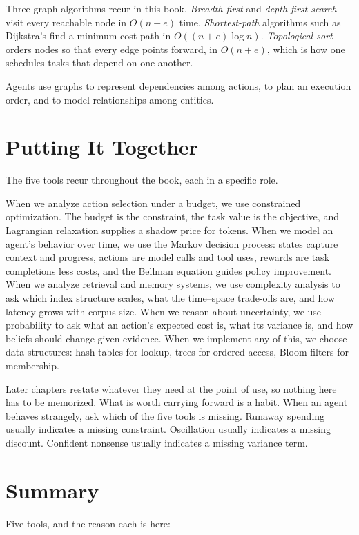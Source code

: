 \documentclass[11pt]{book}
\begin{document}
Three graph algorithms recur in this book. \emph{Breadth-first} and \emph{depth-first search} visit every reachable node in $O(n + e)$ time. \emph{Shortest-path} algorithms such as Dijkstra's find a minimum-cost path in $O((n + e) \log n)$. \emph{Topological sort} orders nodes so that every edge points forward, in $O(n + e)$, which is how one schedules tasks that depend on one another.

Agents use graphs to represent dependencies among actions, to plan an execution order, and to model relationships among entities.

\section{Putting It Together}

The five tools recur throughout the book, each in a specific role.

When we analyze action selection under a budget, we use constrained optimization. The budget is the constraint, the task value is the objective, and Lagrangian relaxation supplies a shadow price for tokens. When we model an agent's behavior over time, we use the Markov decision process: states capture context and progress, actions are model calls and tool uses, rewards are task completions less costs, and the Bellman equation guides policy improvement. When we analyze retrieval and memory systems, we use complexity analysis to ask which index structure scales, what the time--space trade-offs are, and how latency grows with corpus size. When we reason about uncertainty, we use probability to ask what an action's expected cost is, what its variance is, and how beliefs should change given evidence. When we implement any of this, we choose data structures: hash tables for lookup, trees for ordered access, Bloom filters for membership.

Later chapters restate whatever they need at the point of use, so nothing here has to be memorized. What is worth carrying forward is a habit. When an agent behaves strangely, ask which of the five tools is missing. Runaway spending usually indicates a missing constraint. Oscillation usually indicates a missing discount. Confident nonsense usually indicates a missing variance term.

\section{Summary}

Five tools, and the reason each is here:
\end{document}
